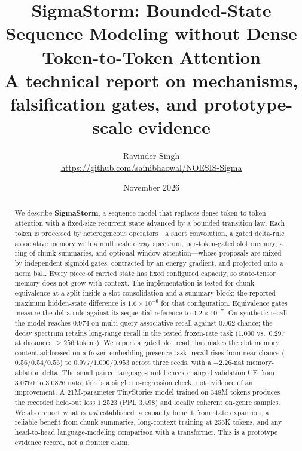 \documentclass[10pt,twocolumn]{article}
\title{\vspace{-1.1em}\textbf{SigmaStorm: Bounded-State Sequence Modeling without Dense Token-to-Token Attention}\\[0.4em]
\large A technical report on mechanisms, falsification gates, and prototype-scale evidence}
\author{Ravinder Singh\\[-0.1em]
\small \url{https://github.com/sainibhaowal/NOESIS-Sigma}}
\date{November 2026}
\begin{document}
\maketitle

\begin{abstract}
We describe \textbf{SigmaStorm}, a sequence model that replaces dense token-to-token
attention with a fixed-size recurrent state advanced by a bounded transition law. Each
token is processed by heterogeneous operators---a short convolution, a gated delta-rule
associative memory with a multiscale decay spectrum, per-token-gated slot memory, a ring
of chunk summaries, and optional window attention---whose proposals are mixed by
independent sigmoid gates, contracted by an energy gradient, and projected onto a norm
ball. Every piece of carried state has fixed configured capacity, so state-tensor memory does not
grow with context. The implementation is tested for chunk equivalence at a split inside a
slot-consolidation and a summary block; the reported maximum hidden-state difference is
$1.6\times10^{-6}$ for that configuration. Equivalence gates measure the delta rule against its
sequential reference to $4.2\times10^{-7}$. On synthetic recall the model reaches $0.974$ on
multi-query associative recall against $0.062$ chance; the decay spectrum retains long-range
recall in the tested frozen-rate task ($1.000$ vs.\ $0.297$ at distances $\geq256$ tokens).
We report a gated slot read that makes the slot memory content-addressed on a frozen-embedding
presence task: recall rises from near chance ($0.56/0.54/0.56$) to
$\mathbf{0.977/1.000/0.953}$ across three seeds, with a $+2.26$-nat memory-ablation delta.
The small paired language-model check changed validation CE from $3.0760$ to $3.0826$ nats;
this is a single no-regression check, not evidence of an improvement. A 21M-parameter
TinyStories model trained on 348M tokens produces the recorded held-out loss $1.2523$
(PPL $3.498$) and locally coherent on-genre samples.
We also report what is \emph{not} established: a capacity benefit from state expansion, a
reliable benefit from chunk summaries, long-context training at 256K tokens, and any
head-to-head language-modeling comparison with a transformer. This is a prototype evidence
record, not a frontier claim.
\end{abstract}














\clearpage
\onecolumn

\end{document}
